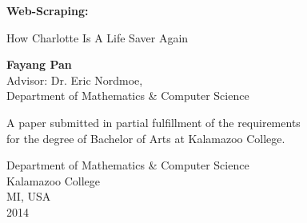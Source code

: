 \documentclass[12pt,twoside,draft]{report}
\begin{document}
\lstset{language=Python,
basicstyle=\ttfamily,
commentstyle=\textit,
breaklines=true,
numbersep=5pt,
xleftmargin=.25in,
xrightmargin=.25in,
columns=fullflexible,
showstringspaces=false}

\begin{titlepage}
    \begin{center}
        \vspace*{2cm}
        \Huge
        \textbf{Web-Scraping:}
        
        \vspace{0.2cm}
        \Large
        How Charlotte Is A Life Saver Again
        
        \vspace{1cm}
        \normalsize
        \textbf{Fayang Pan}\\
        \vspace{1cm}
        Advisor: Dr. Eric Nordmoe, \\Department of Mathematics \& Computer Science
        
        \vfill
        
        A paper submitted in partial fulfillment of the requirements \\for the degree of Bachelor of Arts at Kalamazoo College.
        
        \vspace{0.8cm}
        
        
       	Department of Mathematics \& Computer Science\\
        Kalamazoo College\\
        MI, USA\\
        2014
        
    \end{center}
\end{titlepage}
\newpage
\thispagestyle{empty}
\mbox{}
\end{document}
